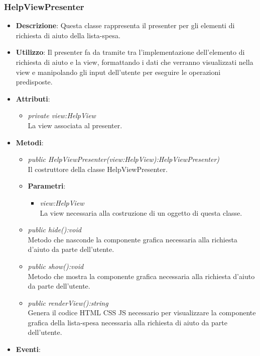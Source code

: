 \subsubsection{HelpViewPresenter}
\begin{itemize}
\item \textbf{Descrizione}: Questa classe rappresenta il presenter per gli elementi di richiesta di aiuto della lista-spesa.
\item \textbf{Utilizzo}: Il presenter fa da tramite tra l'implementazione dell'elemento di richiesta di aiuto e la view, formattando i dati che verranno visualizzati nella view e manipolando gli input dell'utente per eseguire le operazioni predisposte.
\item \textbf{Attributi}:
	\begin{itemize}
	\item \textit{private view:HelpView}\\
	La view associata al presenter.
	\end{itemize}
\item \textbf{Metodi}:
	\begin{itemize}
	\item \textit{public HelpViewPresenter(view:HelpView):HelpViewPresenter)}\\
	Il costruttore della classe HelpViewPresenter.
			\item{\textbf{Parametri}: \begin{itemize}
			\item \textit{view:HelpView}\\
			La view necessaria alla costruzione di un oggetto di questa classe.
			\end{itemize}}
	\item \textit{public hide():void}\\
	Metodo che nasconde la componente grafica necessaria alla richiesta d'aiuto da parte dell'utente.
	\item \textit{public show():void}\\
	Metodo che mostra la componente grafica necessaria alla richiesta d'aiuto da parte dell'utente.
	\item \textit{public renderView():string}\\
	Genera il codice HTML CSS JS necessario per visualizzare la componente grafica della lista-spesa necessaria alla richiesta di aiuto da parte dell'utente.
	\end{itemize}
\item \textbf{Eventi}:
\end{itemize}